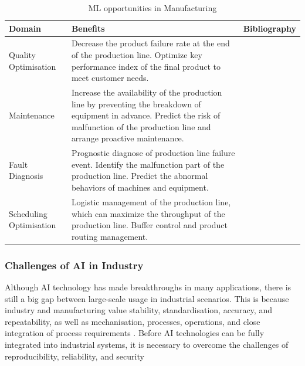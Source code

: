 \begin{table}
\label{tab:ai_benefits}
\begin{tabular}{|l|p{6cm}|p{4cm}|}
\hline
%
Domain &
  Benefits &
    Bibliography \\ \hline
Quality Optimisation &
  Decrease the product failure rate at the end of the production line. Optimize key performance index of the final product to meet customer needs. &
    \citep{lieber2013quality, li2018ensemble, chen2008neural, nagorny2017quality, haeussler1996quality} \\ \hline

Maintenance &
  Increase the availability of the production line by preventing the breakdown of equipment in advance. Predict the risk of malfunction of the production line and arrange proactive maintenance. &
    \citep{nguyen2019new, lee2017application, einabadi2019dynamic, li2017intelligent, liu2016prediction}\\ \hline
Fault Diagnosis &
  Prognostic diagnose of production line failure event. Identify the malfunction part of the production line. Predict the abnormal behaviors of machines and equipment. & \citep{toma2020bearing, wong2006modified, chen2014fault, malik2017artificial, arabaci2010automatic} \\ \hline
Scheduling Optimisation &
  Logistic management of the production line, which can maximize the throughput of the production line. Buffer control and product routing management. & \citep{morariu2020machine, woschank2020review, lolli2019machine, zhang2019review, gomes2016developing} \\ \hline
\end{tabular}
\caption{ML opportunities in Manufacturing}
\end{table}

\subsubsection{Challenges of AI in Industry}

Although AI technology has made breakthroughs in many applications, there is still a big gap between large-scale usage in industrial scenarios. This is because industry and manufacturing value stability, standardisation, accuracy, and repeatability, as well as mechanisation, processes, operations, and close integration of process requirements \citep{lee2020industrial}. Before AI technologies can be fully integrated into industrial systems, it is necessary to overcome the challenges of reproducibility, reliability, and security

